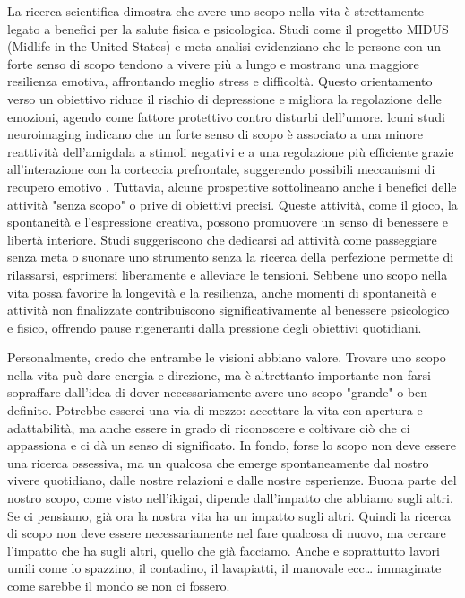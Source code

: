 \documentclass[12pt]{book} %
\begin{document}
\begin{mdframed}[linewidth=1pt]
La ricerca scientifica dimostra che avere uno scopo nella vita è strettamente legato a benefici per la salute fisica e psicologica. Studi come il progetto MIDUS (Midlife in the United States) e meta-analisi evidenziano che le persone con un forte senso di scopo tendono a vivere più a lungo e mostrano una maggiore resilienza emotiva, affrontando meglio stress e difficoltà. Questo orientamento verso un obiettivo riduce il rischio di depressione e migliora la regolazione delle emozioni, agendo come fattore protettivo contro disturbi dell’umore. lcuni studi neuroimaging indicano che un forte senso di scopo è associato a una minore reattività dell’amigdala a stimoli negativi e a una regolazione più efficiente grazie all’interazione con la corteccia prefrontale, suggerendo possibili meccanismi di recupero emotivo  . Tuttavia, alcune prospettive sottolineano anche i benefici delle attività "senza scopo" o prive di obiettivi precisi. Queste attività, come il gioco, la spontaneità e l’espressione creativa, possono promuovere un senso di benessere e libertà interiore. Studi suggeriscono che dedicarsi ad attività come passeggiare senza meta o suonare uno strumento senza la ricerca della perfezione permette di rilassarsi, esprimersi liberamente e alleviare le tensioni. Sebbene uno scopo nella vita possa favorire la longevità e la resilienza, anche momenti di spontaneità e attività non finalizzate contribuiscono significativamente al benessere psicologico e fisico, offrendo pause rigeneranti dalla pressione degli obiettivi quotidiani.

Personalmente, credo che entrambe le visioni abbiano valore. Trovare uno scopo nella vita può dare energia e direzione, ma è altrettanto importante non farsi sopraffare dall'idea di dover necessariamente avere uno scopo "grande" o ben definito. Potrebbe esserci una via di mezzo: accettare la vita con apertura e adattabilità, ma anche essere in grado di riconoscere e coltivare ciò che ci appassiona e ci dà un senso di significato. In fondo, forse lo scopo non deve essere una ricerca ossessiva, ma un qualcosa che emerge spontaneamente dal nostro vivere quotidiano, dalle nostre relazioni e dalle nostre esperienze. Buona parte del nostro scopo, come visto nell'ikigai, dipende dall'impatto che abbiamo sugli altri. Se ci pensiamo, già ora la nostra vita ha un impatto sugli altri. Quindi la ricerca di scopo non deve essere necessariamente nel fare qualcosa di nuovo, ma cercare l'impatto che ha sugli altri, quello che già facciamo. Anche e soprattutto lavori umili come lo spazzino, il contadino, il lavapiatti, il manovale ecc… immaginate come sarebbe il mondo se non ci fossero.
\end{mdframed}
\end{document}
